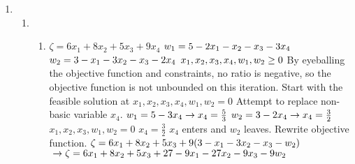 \documentclass{article}
\begin{document}
\begin{enumerate}
\begin{enumerate} [label = \roman*]
            \newline This is a feasible dictionary, so we can move on to simplex method.
            \newline A feasible solution is:
            $\\ x_0, x_1, x_2, x_3, x_4, w_1, w_2 = 0$
            \newline Therefore, this problem is feasible.
            \newline When picking the highest bound, the ratio is $\frac{3}{3}$. Since the ratio is positive, this problem is bounded.
    \end{enumerate}
    \newpage
    \item \begin{enumerate} %
        \item \begin{enumerate} [label = \roman*]
            \item
                $\zeta = 6x_1 + 8x_2 + 5x_3 + 9x_4$
                $\\ w_1 = 5 - 2x_1 - x_2 - x_3 - 3x_4$
                $\\ w_2 = 3 - x_1 - 3x_2 - x_3 - 2x_4$
                $\\ x_1, x_2, x_3, x_4, w_1, w_2 \geq 0$
                \newline By eyeballing the objective function and constraints, no ratio is negative, so the objective function is not unbounded on this iteration.
                \newline Start with the feasible solution at $x_1, x_2, x_3, x_4, w_1, w_2 = 0$
                \newline Attempt to replace non-basic variable $x_4$.
                $\\ w_1 = 5 - 3x_4 \to x_4 = \frac{5}{3}$
                $\\ w_2 = 3 - 2x_4 \to x_4 = \frac{3}{2}$
                \newline $x_1, x_2, x_3, w_1, w_2 = 0$
                \newline $x_4 = \frac{3}{2}$
                \newline $x_4$ enters and $w_2$ leaves.
                \newline Rewrite objective function.
                $\\\zeta = 6x_1 + 8x_2 + 5x_3 + 9(3 - x_1 - 3x_2 - x_3 - w_2)$
                $\\\to \zeta = 6x_1 + 8x_2 + 5x_3 + 27 - 9x_1 - 27x_2 - 9x_3 - 9w_2$

\end{enumerate}
\end{enumerate}
\end{enumerate}
\end{document}
